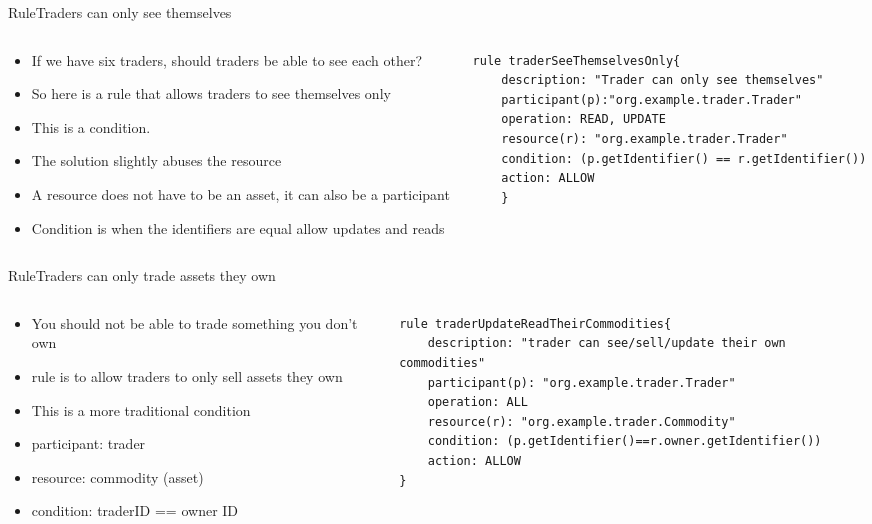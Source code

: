 \documentclass[pdf,table]{beamer}
\begin{document}
\begin{frame}[fragile]{Rule}{Traders can only see themselves}
	\begin{columns}[T]
		\begin{column}{0.48\textwidth}
			\begin{itemize}
				\item If we have six traders, should traders be able to see each other?
				\item So here is a rule that allows traders to see themselves only
				\item This is a condition.
				\item The solution slightly abuses the resource
				\item A resource does not have to be an asset, it can also be a participant
				\item Condition is when the identifiers are equal allow updates and reads
			\end{itemize}
		\end{column}
		\begin{column}{0.48\textwidth}
			\begin{lstlisting}[language=ACL]
rule traderSeeThemselvesOnly{
	description: "Trader can only see themselves"
	participant(p):"org.example.trader.Trader"
	operation: READ, UPDATE
	resource(r): "org.example.trader.Trader"
	condition: (p.getIdentifier() == r.getIdentifier())
	action: ALLOW
	}
			\end{lstlisting}
		\end{column}
	\end{columns}	
\end{frame}

\begin{frame}[fragile]{Rule}{Traders can only trade assets they own}
	\begin{columns}[T]
		\begin{column}{0.48\textwidth}
			\begin{itemize}
				\item You should not be able to trade something you don't own
				\item rule is to allow traders to only sell assets they own
				\item This is a more traditional condition
				\item participant: trader
				\item resource: commodity (asset)
				\item condition: traderID == owner ID
			\end{itemize}
		\end{column}
		\begin{column}{0.48\textwidth}
			\begin{lstlisting}[language=ACL]
rule traderUpdateReadTheirCommodities{
	description: "trader can see/sell/update their own commodities"
	participant(p): "org.example.trader.Trader"
	operation: ALL
	resource(r): "org.example.trader.Commodity"
	condition: (p.getIdentifier()==r.owner.getIdentifier())
	action: ALLOW 
}	
			\end{lstlisting}
		\end{column}
	\end{columns}	
\end{frame}
\end{document}
